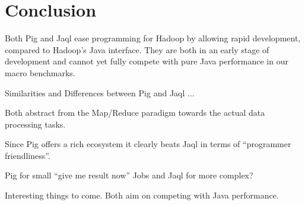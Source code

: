 \section{Conclusion}                      

Both Pig and Jaql ease programming for Hadoop by allowing rapid development, compared to Hadoop's
Java interface. They are both in an early stage of development and cannot yet fully compete with
pure Java performance in our macro benchmarks.
                                                                                                             
Similarities and Differences between Pig and Jaql ... 

Both abstract from the Map/Reduce paradigm towards the actual data processing tasks.

Since Pig offers a rich ecosystem it clearly beats Jaql in terms of  ``programmer friendliness''.

Pig for small ``give me result now'' Jobs and Jaql for more complex?

Interesting things to come. Both aim on competing with Java performance.
